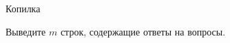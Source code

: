 \begin{problem}{Копилка}
\OutputFile

Выведите $m$ строк, содержащие ответы на вопросы.


\Examples

\begin{example}
%
\end{example}

\end{problem}

